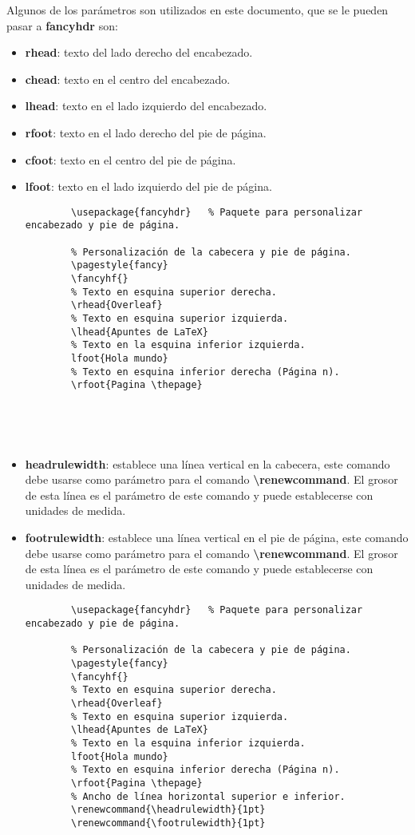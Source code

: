 Algunos de los parámetros son utilizados en este documento, que se le pueden pasar a \textbf{fancyhdr} son:
\begin{itemize}
    \item \textbf{rhead}: texto del lado derecho del encabezado.
    \item \textbf{chead}: texto en el centro del encabezado.
    \item \textbf{lhead}: texto en el lado izquierdo del encabezado.
    \item \textbf{rfoot}: texto en el lado derecho del pie de página.
    \item \textbf{cfoot}: texto en el centro del pie de página.
    \item \textbf{lfoot}: texto en el lado izquierdo del pie de página.
    \begin{lstlisting}
        \usepackage{fancyhdr}	% Paquete para personalizar encabezado y pie de página.
    
        % Personalización de la cabecera y pie de página.
        \pagestyle{fancy}
        \fancyhf{}
        % Texto en esquina superior derecha.
        \rhead{Overleaf}
        % Texto en esquina superior izquierda.
        \lhead{Apuntes de LaTeX}
        % Texto en la esquina inferior izquierda.
        lfoot{Hola mundo}
        % Texto en esquina inferior derecha (Página n).
        \rfoot{Pagina \thepage}

        
    
        
    \end{lstlisting}
    \item \textbf{headrulewidth}: establece una línea vertical en la cabecera, este comando debe usarse como parámetro para el comando \textbf{\textbackslash{renewcommand}}. El grosor de esta línea es el parámetro de este comando y puede establecerse con unidades de medida.
    \item \textbf{footrulewidth}: establece una línea vertical en el pie de página, este comando debe usarse como parámetro para el comando \textbf{\textbackslash{renewcommand}}. El grosor de esta línea es el parámetro de este comando y puede establecerse con unidades de medida.
    \begin{lstlisting}
        \usepackage{fancyhdr}	% Paquete para personalizar encabezado y pie de página.
    
        % Personalización de la cabecera y pie de página.
        \pagestyle{fancy}
        \fancyhf{}
        % Texto en esquina superior derecha.
        \rhead{Overleaf}
        % Texto en esquina superior izquierda.
        \lhead{Apuntes de LaTeX}
        % Texto en la esquina inferior izquierda.
        lfoot{Hola mundo}
        % Texto en esquina inferior derecha (Página n).
        \rfoot{Pagina \thepage}
        % Ancho de línea horizontal superior e inferior.
        \renewcommand{\headrulewidth}{1pt}
        \renewcommand{\footrulewidth}{1pt}


\end{lstlisting}
\end{itemize}
